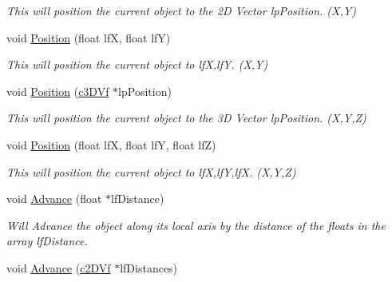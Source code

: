 \begin{DoxyCompactItemize}
\begin{DoxyCompactList}\small\item\em This will position the current object to the 2D Vector lpPosition. (X,Y) \end{DoxyCompactList}\item 
\hypertarget{classc_matrix4_a81cd364d37dc5eae6f968551331ad7a3}{
void \hyperlink{classc_matrix4_a81cd364d37dc5eae6f968551331ad7a3}{Position} (float lfX, float lfY)}
\label{classc_matrix4_a81cd364d37dc5eae6f968551331ad7a3}

\begin{DoxyCompactList}\small\item\em This will position the current object to lfX,lfY. (X,Y) \end{DoxyCompactList}\item 
\hypertarget{classc_matrix4_a8a49976693c27e4fbb5fce427eb6bcf5}{
void \hyperlink{classc_matrix4_a8a49976693c27e4fbb5fce427eb6bcf5}{Position} (\hyperlink{classc3_d_vf}{c3DVf} $\ast$lpPosition)}
\label{classc_matrix4_a8a49976693c27e4fbb5fce427eb6bcf5}

\begin{DoxyCompactList}\small\item\em This will position the current object to the 3D Vector lpPosition. (X,Y,Z) \end{DoxyCompactList}\item 
\hypertarget{classc_matrix4_ae404d9b94cb676d9896385fef1eda422}{
void \hyperlink{classc_matrix4_ae404d9b94cb676d9896385fef1eda422}{Position} (float lfX, float lfY, float lfZ)}
\label{classc_matrix4_ae404d9b94cb676d9896385fef1eda422}

\begin{DoxyCompactList}\small\item\em This will position the current object to lfX,lfY,lfX. (X,Y,Z) \end{DoxyCompactList}\item 
\hypertarget{classc_matrix4_a91f9e8d79d7721ba35f59c754a5507d1}{
void \hyperlink{classc_matrix4_a91f9e8d79d7721ba35f59c754a5507d1}{Advance} (float $\ast$lfDistance)}
\label{classc_matrix4_a91f9e8d79d7721ba35f59c754a5507d1}

\begin{DoxyCompactList}\small\item\em Will Advance the object along its local axis by the distance of the floats in the array lfDistance. \end{DoxyCompactList}\item 
\hypertarget{classc_matrix4_a6c53b28448e2d2531a19cd49955f5901}{
void \hyperlink{classc_matrix4_a6c53b28448e2d2531a19cd49955f5901}{Advance} (\hyperlink{classc2_d_vf}{c2DVf} $\ast$lfDistances)}
\label{classc_matrix4_a6c53b28448e2d2531a19cd49955f5901}


\end{DoxyCompactItemize}
